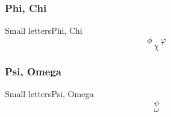 \documentclass{beamer}
\begin{document}
         \subsubsection{Phi, Chi}
            \begin{frame}{Small letters}{Phi, Chi}
               \[ \phi \quad \varphi \]
               \[ \chi \]
            \end{frame}
         \subsubsection{Psi, Omega}
            \begin{frame}{Small letters}{Psi, Omega}
               \[ \psi \]
               \[ \omega \]
            \end{frame}
\end{document}
